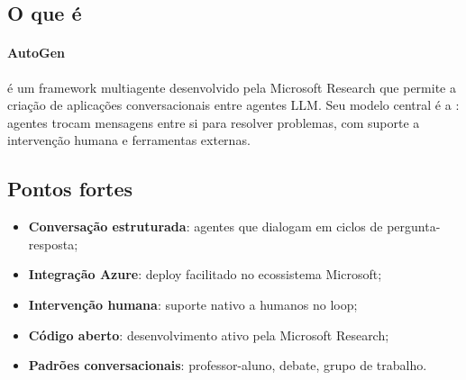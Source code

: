 \subsection{O que é}
\paragraph{AutoGen} é um framework multiagente desenvolvido pela Microsoft
Research que permite a criação de aplicações conversacionais entre agentes
LLM. Seu modelo central é a : agentes trocam
mensagens entre si para resolver problemas, com suporte a intervenção
humana e ferramentas externas.
\subsection{Pontos fortes}
\begin{itemize}
\item \textbf{Conversação estruturada}: agentes que dialogam em
ciclos de pergunta-resposta;
\item \textbf{Integração Azure}: deploy facilitado no ecossistema
Microsoft;
\item \textbf{Intervenção humana}: suporte nativo a humanos no loop;
\item \textbf{Código aberto}: desenvolvimento ativo pela Microsoft
Research;
\item \textbf{Padrões conversacionais}: professor-aluno,
debate, grupo de trabalho.
\end{itemize}
